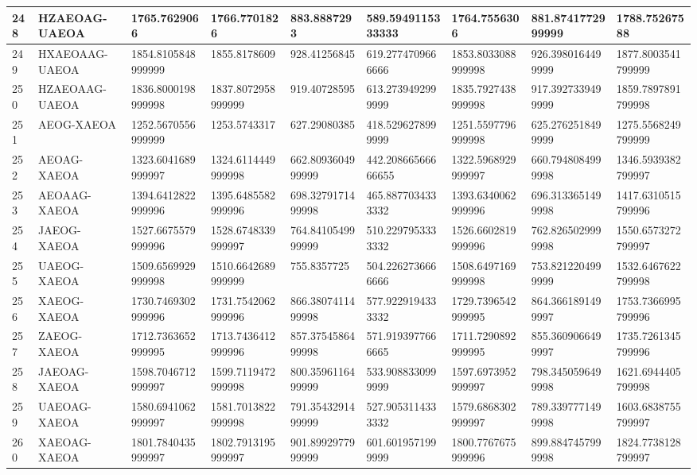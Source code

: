 {\begin{longtable}{|l|l|l|l|l|l|l|l|l|}
        248 & HZAEOAG-UAEOA & 1765.7629066 & 1766.7701826 & 883.8887293 & 589.5949115333333 & 1764.7556306 & 881.8741772999999 & 1788.75267588 \\ \hline
        249 & HXAEOAAG-UAEOA & 1854.8105848999999 & 1855.8178609 & 928.41256845 & 619.2774709666666 & 1853.8033088999998 & 926.3980164499999 & 1877.8003541799999 \\ \hline
        250 & HZAEOAAG-UAEOA & 1836.8000198999998 & 1837.8072958999999 & 919.40728595 & 613.2739492999999 & 1835.7927438999998 & 917.3927339499999 & 1859.7897891799998 \\ \hline
        251 & AEOG-XAEOA & 1252.5670556999999 & 1253.5743317 & 627.29080385 & 418.5296278999999 & 1251.5597796999998 & 625.2762518499999 & 1275.5568249799999 \\ \hline
        252 & AEOAG-XAEOA & 1323.6041689999997 & 1324.6114449999998 & 662.8093604999999 & 442.20866566666655 & 1322.5968929999997 & 660.7948084999998 & 1346.5939382799997 \\ \hline
        253 & AEOAAG-XAEOA & 1394.6412822999996 & 1395.6485582999996 & 698.3279171499998 & 465.8877034333332 & 1393.6340062999996 & 696.3133651499998 & 1417.6310515799996 \\ \hline
        254 & JAEOG-XAEOA & 1527.6675579999996 & 1528.6748339999997 & 764.8410549999999 & 510.2297953333332 & 1526.6602819999996 & 762.8265029999998 & 1550.6573272799997 \\ \hline
        255 & UAEOG-XAEOA & 1509.6569929999998 & 1510.6642689999999 & 755.8357725 & 504.2262736666666 & 1508.6497169999998 & 753.8212204999999 & 1532.6467622799998 \\ \hline
        256 & XAEOG-XAEOA & 1730.7469302999996 & 1731.7542062999996 & 866.3807411499998 & 577.9229194333332 & 1729.7396542999995 & 864.3661891499997 & 1753.7366995799996 \\ \hline
        257 & ZAEOG-XAEOA & 1712.7363652999995 & 1713.7436412999996 & 857.3754586499998 & 571.9193977666665 & 1711.7290892999995 & 855.3609066499997 & 1735.7261345799996 \\ \hline
        258 & JAEOAG-XAEOA & 1598.7046712999997 & 1599.7119472999998 & 800.3596116499999 & 533.9088330999999 & 1597.6973952999997 & 798.3450596499998 & 1621.6944405799998 \\ \hline
        259 & UAEOAG-XAEOA & 1580.6941062999997 & 1581.7013822999998 & 791.3543291499999 & 527.9053114333332 & 1579.6868302999997 & 789.3397771499998 & 1603.6838755799997 \\ \hline
        260 & XAEOAG-XAEOA & 1801.7840435999997 & 1802.7913195999997 & 901.8992977999999 & 601.6019571999999 & 1800.7767675999996 & 899.8847457999998 & 1824.7738128799997 \\ \hline

\end{longtable}}
